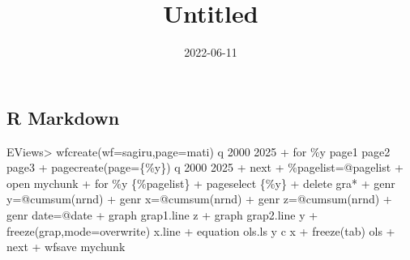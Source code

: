 \documentclass[
]{article}
\title{Untitled}
\author{}
\date{\vspace{-2.5em}2022-06-11}
\newenvironment{Shaded}{\begin{snugshade}}{\end{snugshade}}
\newcommand{\NormalTok}[1]{#1}
\begin{document}
\maketitle

{
\setcounter{tocdepth}{2}
\tableofcontents
}
\hypertarget{r-markdown}{%
\subsection{R Markdown}\label{r-markdown}}

\begin{Shaded}
\begin{Highlighting}[]
\NormalTok{EViews\textgreater{} wfcreate(wf=sagiru,page=mati) q 2000 2025}
\NormalTok{+ for \%y page1 page2 page3 }
\NormalTok{+ pagecreate(page=\{\%y\}) q 2000 2025}
\NormalTok{+ next}
\NormalTok{+ \%pagelist=@pagelist}
\NormalTok{+ \textquotesingle{}open mychunk}
\NormalTok{+ for \%y \{\%pagelist\}}
\NormalTok{+ pageselect \{\%y\}}
\NormalTok{+ delete gra*}
\NormalTok{+ genr y=@cumsum(nrnd)}
\NormalTok{+ genr x=@cumsum(nrnd)}
\NormalTok{+ genr z=@cumsum(nrnd)}
\NormalTok{+ genr date=@date}
\NormalTok{+                      graph grap1.line z  }
\NormalTok{+                            graph grap2.line y }
\NormalTok{+    freeze(grap,mode=overwrite) x.line}
\NormalTok{+ equation ols.ls y c x}
\NormalTok{+ freeze(tab) ols}
\NormalTok{+ next}
\NormalTok{+ wfsave mychunk}
\end{Highlighting}
\end{Shaded}
\end{document}
